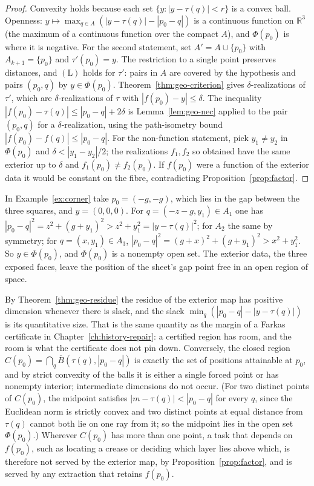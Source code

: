 \begin{proof}
Convexity holds because each set $\{y:|y-\tau(q)|<r\}$ is a convex ball. Openness: $y\mapsto\max_{q\in A}(|y-\tau(q)|-|p_0-q|)$ is a continuous function on $\mathbb R^3$ (the maximum of a continuous function over the compact $A$), and $\Phi(p_0)$ is where it is negative. For the second statement, set $A'=A\cup\{p_0\}$ with $A_{k+1}=\{p_0\}$ and $\tau'(p_0)=y$. The restriction to a single point preserves distances, and $(\mathrm L)$ holds for $\tau'$: pairs in $A$ are covered by the hypothesis and pairs $(p_0,q)$ by $y\in\Phi(p_0)$. Theorem~\ref{thm:geo-criterion} gives $\delta$-realizations of $\tau'$, which are $\delta$-realizations of $\tau$ with $|f(p_0)-y|\le\delta$. The inequality $|f(p_0)-\tau(q)|\le|p_0-q|+2\delta$ is Lemma~\ref{lem:geo-nec} applied to the pair $(p_0,q)$ for a $\delta$-realization, using the path-isometry bound $|f(p_0)-f(q)|\le|p_0-q|$. For the non-function statement, pick $y_1\ne y_2$ in $\Phi(p_0)$ and $\delta<|y_1-y_2|/2$; the realizations $f_1,f_2$ so obtained have the same exterior up to $\delta$ and $f_1(p_0)\ne f_2(p_0)$. If $f(p_0)$ were a function of the exterior data it would be constant on the fibre, contradicting Proposition~\ref{prop:factor}.
\end{proof}

\begin{example}
\label{ex:corner-residue}
In Example~\ref{ex:corner} take $p_0=(-g,-g)$, which lies in the gap between the three squares, and $y=(0,0,0)$. For $q=(-z-g,y_1)\in A_1$ one has $|p_0-q|^2=z^2+(g+y_1)^2>z^2+y_1^2=|y-\tau(q)|^2$; for $A_2$ the same by symmetry; for $q=(x,y_1)\in A_3$, $|p_0-q|^2=(g+x)^2+(g+y_1)^2>x^2+y_1^2$. So $y\in\Phi(p_0)$, and $\Phi(p_0)$ is a nonempty open set. The exterior data, the three exposed faces, leave the position of the sheet's gap point free in an open region of space.
\end{example}

By Theorem~\ref{thm:geo-residue} the residue of the exterior map has positive dimension whenever there is slack, and the slack $\min_q(|p_0-q|-|y-\tau(q)|)$ is its quantitative size. That is the same quantity as the margin of a Farkas certificate in Chapter~\ref{ch:history-repair}: a certified region has room, and the room is what the certificate does not pin down. Conversely, the closed region $C(p_0)=\bigcap_q\overline B(\tau(q),|p_0-q|)$ is exactly the set of positions attainable at $p_0$, and by strict convexity of the balls it is either a single forced point or has nonempty interior; intermediate dimensions do not occur. (For two distinct points of $C(p_0)$, the midpoint satisfies $|m-\tau(q)|<|p_0-q|$ for every $q$, since the Euclidean norm is strictly convex and two distinct points at equal distance from $\tau(q)$ cannot both lie on one ray from it; so the midpoint lies in the open set $\Phi(p_0)$.) Wherever $C(p_0)$ has more than one point, a task that depends on $f(p_0)$, such as locating a crease or deciding which layer lies above which, is therefore not served by the exterior map, by Proposition~\ref{prop:factor}, and is served by any extraction that retains $f(p_0)$.

